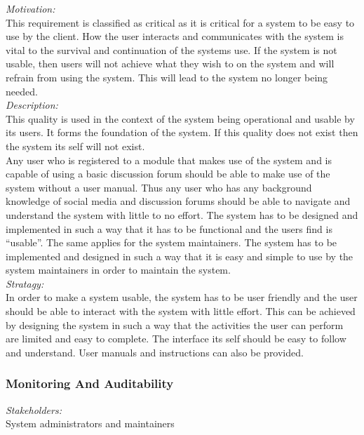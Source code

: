 \documentclass[a4paper,12pt]{report}
\begin{document}
		\emph{Motivation: }\\ This requirement is classified as critical  as it is critical for a system to be easy to use by the client. How the user interacts and communicates with the system is vital to the survival and continuation of the systems use. If the system is not usable, then users will not achieve what they wish to on the system and will refrain from using the system. This will lead to the system no longer being needed. \\
		
		\emph{Description: }\\ This quality is used in the context of the system being operational and usable by its users. It forms the foundation of the system. If this quality does not exist then the system its self will not exist.\\
		Any user who is registered to a module that makes use of the system and is capable of using a basic discussion forum should be able to make use of the system without a user manual. Thus any user who has any background knowledge of social media and discussion forums should be able to navigate and understand the system with little to no effort. The system has to be designed and implemented in such a way that it has to be functional and the users find is “usable”. The same applies for the system maintainers. The system has to be implemented and designed in such a way that it is easy and simple to use by the system maintainers in order to maintain the system.\\
		
		\emph{Stratagy: }\\ In order to make a system usable, the system has to be user friendly and the user should be able to interact with the system with little effort. This can be achieved by designing the system in such a way that the activities the user can perform are limited and easy to complete. The interface its self should be easy to follow and understand. User manuals and instructions can also be provided.\\
		
		\subsubsection{Monitoring And Auditability}
		\emph{Stakeholders: }\\ System administrators and maintainers\\
		
\end{document}
